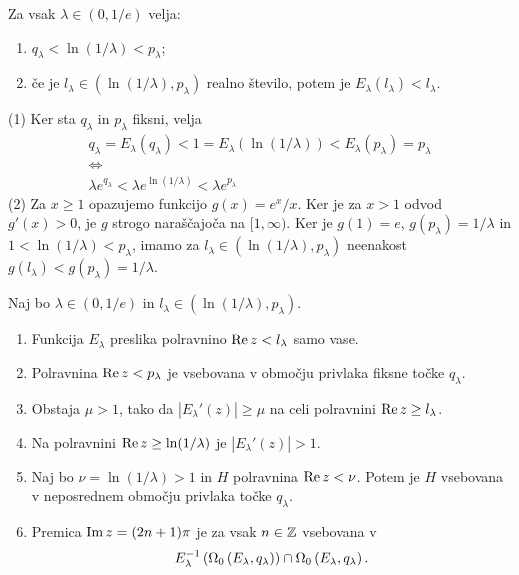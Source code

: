 \begin{lema} \label{lem:enadva}
    Za vsak \(\lambda \in (0, 1/e)\) velja:
    \begin{enumerate}[label=(\arabic*)]
        \item \(q_\lambda < \ln (1 / \lambda) < p_\lambda\);
        \item če je \(l_\lambda \in (\ln (1 / \lambda), p_\lambda)\) realno število, potem je \(E_\lambda (l_\lambda) < l_\lambda\).
    \end{enumerate}
\end{lema}

\begin{dokaz}
    (1) Ker sta \(q_\lambda\) in \(p_\lambda\) fiksni, velja
    \begin{gather*}
        q_\lambda = E_\lambda (q_\lambda) < 1 = E_\lambda (\ln (1 / \lambda)) < E_\lambda (p_\lambda) = p_\lambda\\
        \iff\\
        \lambda e^{q_\lambda} < \lambda e^{\ln (1 / \lambda)} < \lambda e^{p_\lambda}
    \end{gather*}
    (2) Za \(x \geq 1\) opazujemo funkcijo \(g (x) = e^x / x\). Ker je za \(x > 1\) odvod \(g' (x) > 0\), je \(g\) strogo naraščajoča na \([1, \infty)\). Ker je \(g (1) = e\), \(g (p_\lambda) = 1 / \lambda\) in \(1 < \ln (1 / \lambda) < p_\lambda\), imamo za \(l_\lambda \in (\ln (1 / \lambda), p_\lambda)\) neenakost \(g (l_\lambda) < g (p_\lambda) = 1 / \lambda\).
\end{dokaz}

\begin{trditev} \label{prop:trinajst}
    Naj bo \(\lambda \in (0, 1/e)\) in \(l_\lambda \in (\ln (1 / \lambda), p_\lambda)\).
    \begin{enumerate}[label=(\arabic*)]
        \item Funkcija \(E_\lambda\) preslika polravnino \(\operatorname{Re} z < l_\lambda\) samo vase.
        \item Polravnina \(\operatorname{Re} z < p_\lambda\) je vsebovana v območju privlaka fiksne točke \(q_\lambda\).
        \item Obstaja \(\mu > 1\), tako da \(|E_\lambda' (z)| \geq \mu\) na celi polravnini \(\operatorname{Re} z \geq l_\lambda\).
        \item Na polravnini \(\operatorname{Re} z \geq \ln (1 / \lambda)\) je \(|E_\lambda' (z)| > 1\).
        \item Naj bo \(\nu = \ln (1 / \lambda) > 1\) in \(H\) polravnina \(\operatorname{Re} z < \nu\). Potem je \(H\) vsebovana v neposrednem območju privlaka točke \(q_\lambda\).
        \item Premica \(\operatorname{Im} z = (2n + 1) \pi\) je za vsak \(n \in \mathbb Z\) vsebovana v
        \[E_\lambda^{-1} \left( \Omega_0 \left( E_\lambda, q_\lambda \right) \right) \cap \Omega_0 \left( E_\lambda, q_\lambda \right).\]
    \end{enumerate}
\end{trditev}

